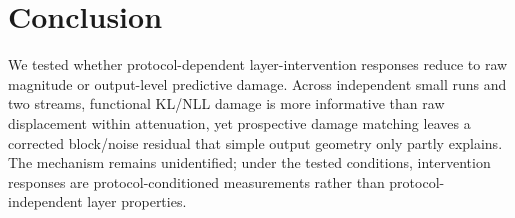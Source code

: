 \section{Conclusion}

We tested whether protocol-dependent layer-intervention responses reduce to
raw magnitude or output-level predictive damage. Across independent small
\model{} runs and two streams, functional KL/NLL damage is more informative
than raw displacement within attenuation, yet prospective damage matching
leaves a corrected block/noise residual that simple output geometry only partly
explains. The mechanism remains unidentified; under the tested conditions,
intervention responses are protocol-conditioned measurements rather than
protocol-independent layer properties.
